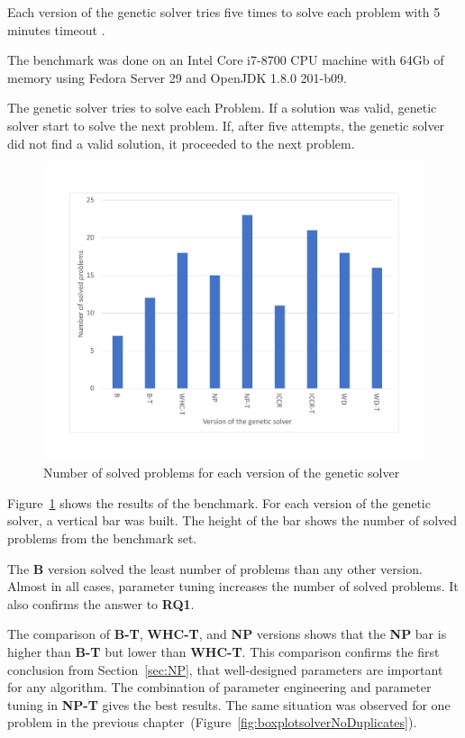 Each version of the genetic solver tries five times to solve each problem with 5 minutes timeout .

The benchmark was done on an Intel Core i7-8700 CPU machine with 64Gb of memory using Fedora Server 29 and OpenJDK 1.8.0 201-b09.

The genetic solver tries to solve each Problem. If a solution was valid, genetic solver start to solve the next problem. If, after five attempts, the genetic solver did not find a valid solution, it proceeded to the next problem.

\begin{figure}
	\centering
	\includegraphics[width=\textwidth]{images/EvaluationNumberOfSolvedProblems.pdf}
	\caption[Number of problems for each version of the genetic solver]{Number of solved problems for each version of the genetic solver}
	\label{fig:EvaluationNumberOfSolvedProblems}
\end{figure}

Figure~\ref{fig:EvaluationNumberOfSolvedProblems} shows the results of the benchmark. For each version of the genetic solver, a vertical bar was built. The height of the bar shows the number of solved problems from the benchmark set. 

The \textbf{B} version solved the least number of problems than any other version. Almost in all cases, parameter tuning increases the number of solved problems. It also confirms the answer to \textbf{RQ1}. 

The comparison of \textbf{B-T}, \textbf{WHC-T}, and \textbf{NP} versions shows that the \textbf{NP} bar is higher than \textbf{B-T} but lower than \textbf{WHC-T}. This comparison confirms the first conclusion from Section~\ref{sec:NP}, that well-designed parameters are important for any algorithm. The combination of parameter engineering and parameter tuning in \textbf{NP-T} gives the best results. The same situation was observed for one problem in the previous chapter~(Figure~\ref{fig:boxplotsolverNoDuplicates}). 

